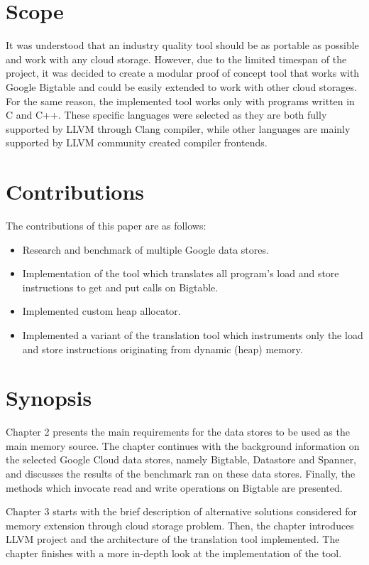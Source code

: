 \documentclass[bsc,frontabs,twoside,singlespacing,parskip,deptreport]{infthesis}     %
\begin{document}
\section{Scope}

It was understood that an industry quality tool should be as portable as possible and work with any cloud storage. However, due to the limited timespan of the project, it was decided to create a modular proof of concept tool that works with Google Bigtable and could be easily extended to work with other cloud storages. For the same reason, the implemented tool works only with programs written in C and C++. These specific languages were selected as they are both fully supported by LLVM through Clang compiler, while other languages are mainly supported by LLVM community created compiler frontends.

\section{Contributions}

The contributions of this paper are as follows:
\begin{itemize}
\item
Research and benchmark of multiple Google data stores.
\item
Implementation of the tool which translates all program's load and store instructions to get and put calls on Bigtable.
\item
Implemented custom heap allocator.
\item
Implemented a variant of the translation tool which instruments only the load and store instructions originating from dynamic (heap) memory.
\end{itemize}

\section{Synopsis}

Chapter 2 presents the main requirements for the data stores to be used as the main memory source. The chapter continues with the background information on the selected Google Cloud data stores, namely Bigtable, Datastore and Spanner, and discusses the results of the benchmark ran on these data stores. Finally, the methods which invocate read and write operations on Bigtable are presented.

Chapter 3 starts with the brief description of alternative solutions considered for memory extension through cloud storage problem. Then, the chapter introduces LLVM project and the architecture of the translation tool implemented. The chapter finishes with a more in-depth look at the implementation of the tool.
\end{document}
